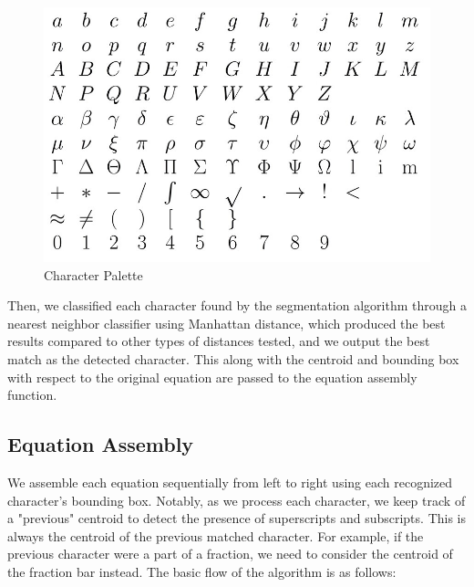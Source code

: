 \documentclass[journal]{IEEEtran}
\begin{document}
\begin{figure}[!t]
    \centering
    \includegraphics[width=\columnwidth]{palette}
    \caption{Character Palette}
    \label{fig:palette}
\end{figure}

Then, we classified each character found by the segmentation algorithm through a nearest neighbor classifier using Manhattan distance, which produced the best results compared to other types of distances tested, and we output the best match as the detected character. This along with the centroid and bounding box with respect to the original equation are passed to the equation assembly function.

\subsection{Equation Assembly}
We assemble each equation sequentially from left to right using each recognized character's bounding box. Notably, as we process each character, we keep track of a "previous" centroid to detect the presence of superscripts and subscripts. This is always the centroid of the previous matched character. For example, if the previous character were a  part of a fraction, we need to consider the centroid of the fraction bar instead. The basic flow of the algorithm is as follows:
\end{document}
